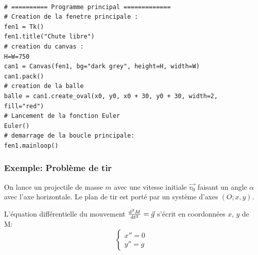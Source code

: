 \documentclass{beamer}
\def \de {{\rm d}}
\begin{document}
\begin{frame}[fragile]

\begin{verbatim}

# ========== Programme principal =============
# Creation de la fenetre principale :
fen1 = Tk()
fen1.title("Chute libre")
# creation du canvas :
H=W=750
can1 = Canvas(fen1, bg="dark grey", height=H, width=W)
can1.pack()
# creation de la balle
balle = can1.create_oval(x0, y0, x0 + 30, y0 + 30, width=2, fill="red")
# Lancement de la fonction Euler
Euler()
# demarrage de la boucle principale:
fen1.mainloop()
\end{verbatim}
\end{frame}
 \begin{frame}
 \frametitle{Exemple: Problème de tir}
  On lance un projectile de masse $m$ avec une vitesse initiale $\vec{v_0}$ faisant un angle $\alpha$ avec l'axe horizontale. Le plan de tir est porté par un système d'axes $(O;x,y)$.
\begin{center}
 \end{center}

 L'équation différentielle du mouvement $\frac{\de^2 M}{\de t^2}=\vec g$ s'écrit  en coordonnées $x$, $y$ de M: 
  \[\left\{\begin{array}{l}
  x''=0\\
  y''=g
  \end{array}\right.\]
  
  \end{frame}
\end{document}
